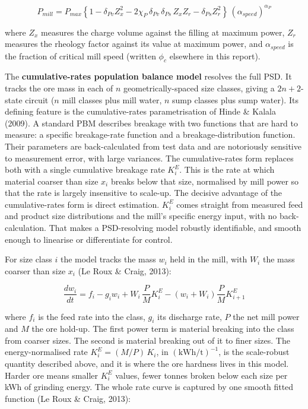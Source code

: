\documentclass[
  14pt,
]{extarticle}
\begin{document}
\begin{equation}P_{mill}=P_{max}\left\{1-\delta_{Pv}Z_x^{2}-2\chi_P\,\delta_{Pv}\,\delta_{Ps}\,Z_x Z_r-\delta_{Ps}Z_r^{2}\right\}\,(\alpha_{speed})^{\alpha_P}\tag{3}\end{equation}

\endgroup

where \(Z_x\) measures the charge volume against the filling at maximum
power, \(Z_r\) measures the rheology factor against its value at maximum
power, and \(\alpha_{speed}\) is the fraction of critical mill speed
(written \(\phi_c\) elsewhere in this report).

The \textbf{cumulative-rates population balance model} resolves the full
PSD. It tracks the ore mass in each of $n$ geometrically-spaced
size classes, giving a $2n{+}2$-state circuit ($n$ mill
classes plus mill water, $n$ sump classes plus sump water). Its
defining feature is the cumulative-rates parametrisation of Hinde \&
Kalala (2009). A standard PBM describes breakage with two functions that
are hard to measure: a specific breakage-rate function and a
breakage-distribution function. Their parameters are back-calculated
from test data and are notoriously sensitive to measurement error, with
large variances. The cumulative-rates form replaces both with a single
cumulative breakage rate $K_i^{E}$. This is the rate at which
material coarser than size $x_i$ breaks below that size, normalised by
mill power so that the rate is largely insensitive to scale-up. The decisive advantage of the cumulative-rates form is direct
estimation. $K_i^{E}$ comes straight from
measured feed and product size distributions and the mill's specific
energy input, with no back-calculation. That makes a PSD-resolving model
robustly identifiable, and smooth enough to linearise or differentiate
for control.

For size class $i$ the model tracks the mass $w_i$ held
in the mill, with $W_i$ the mass coarser than size $x_i$
(Le Roux \& Craig, 2013):

\begingroup\small

\begin{equation}\frac{dw_i}{dt}=f_i-g_i w_i+W_i\,\frac{P}{M}K_i^{E}-\left(w_i+W_i\right)\frac{P}{M}K_{i+1}^{E}\tag{4}\end{equation}

\endgroup

where $f_i$ is the feed rate into the class, $g_i$ its
discharge rate, $P$ the net mill power and $M$ the ore
hold-up. The first power term is material breaking into the class from
coarser sizes. The second is material breaking out of it to finer sizes.
The energy-normalised rate $K_i^{E}=(M/P)\,K_i$, in
$(\mathrm{kWh/t})^{-1}$, is the scale-robust quantity described above, and it is
where the ore hardness lives in this model. Harder ore means smaller
$K_i^{E}$ values, fewer tonnes broken below each size per kWh
of grinding energy. The whole rate curve is captured by one smooth
fitted function (Le Roux \& Craig, 2013):
\end{document}
